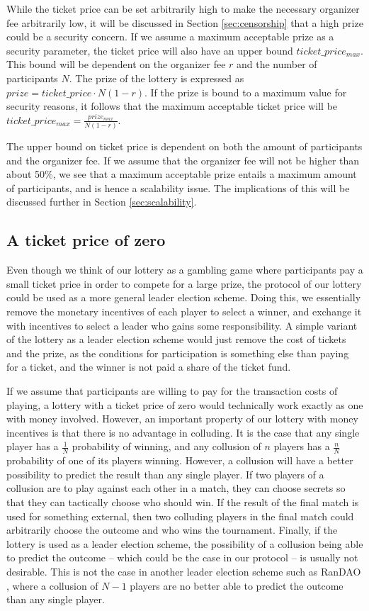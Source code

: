 While the ticket price can be set arbitrarily high to make the necessary organizer fee arbitrarily low, it will be discussed in Section \ref{sec:censorship} that a high prize could be a security concern. If we assume a maximum acceptable prize as a security parameter, the ticket price will also have an upper bound $ticket\_price_{max}$. This bound will be dependent on the organizer fee $r$ and the number of participants $N$. The prize of the lottery is expressed as $prize=ticket\_price \cdot N(1-r)$. If the prize is bound to a maximum value for security reasons, it follows that the maximum acceptable ticket price will be $ticket\_price_{max}=\frac{prize_{max}}{N(1-r)}$. 

The upper bound on ticket price is dependent on both the amount of participants and the organizer fee. If we assume that the organizer fee will not be higher than about 50\%, we see that a maximum acceptable prize entails a maximum amount of participants, and is hence a scalability issue. The implications of this will be discussed further in Section \ref{sec:scalability}.

\subsection{A ticket price of zero}
Even though we think of our lottery as a gambling game where participants pay a small ticket price in order to compete for a large prize, the protocol of our lottery could be used as a more general leader election scheme. Doing this, we essentially remove the monetary incentives of each player to select a winner, and exchange it with incentives to select a leader who gains some responsibility. A simple variant of the lottery as a leader election scheme would just remove the cost of tickets and the prize, as the conditions for participation is something else than paying for a ticket, and the winner is not paid a share of the ticket fund.

If we assume that participants are willing to pay for the transaction costs of playing, a lottery with a ticket price of zero would technically work exactly as one with money involved. However, an important property of our lottery with money incentives is that there is no advantage in colluding. It is the case that any single player has a $\frac{1}{N}$ probability of winning, and any collusion of $n$ players has a $\frac{n}{N}$ probability of one of its players winning. However, a collusion will have a better possibility to predict the result than any single player. If two players of a collusion are to play against each other in a match, they can choose secrets so that they can tactically choose who should win. If the result of the final match is used for something external, then two colluding players in the final match could arbitrarily choose the outcome and who wins the tournament. Finally, if the lottery is used as a leader election scheme, the possibility of a collusion being able to predict the outcome – which could be the case in our protocol – is usually not desirable. This is not the case in another leader election scheme such as RanDAO \cite{randao2015randao}, where a collusion of $N-1$ players are no better able to predict the outcome than any single player.


